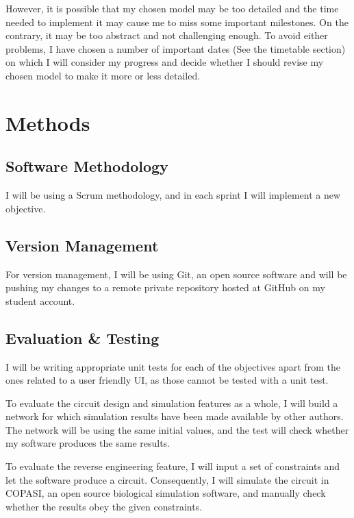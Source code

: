\documentclass{article}
\begin{document}
	\par However, it is possible that my chosen model may be too detailed and the time needed to implement it may cause me to miss some important milestones. On the contrary, it may be too abstract and not challenging enough. To avoid either problems, I have chosen a number of important dates (See the timetable section) on which I will consider my progress and decide whether I should revise my chosen model to make it more or less detailed.
	
	
	\section{Methods}
	
	\subsection{Software Methodology}
	\par I will be using a Scrum methodology, and in each sprint I will implement a new objective.
	
	
	\subsection{Version Management}
	\par For version management, I will be using Git, an open source software and will be pushing my changes to a remote private repository hosted at GitHub on my student account.
	
	\subsection{Evaluation \& Testing}
	\par I will be writing appropriate unit tests for each of the objectives apart from the ones related to a user friendly UI, as those cannot be tested with a unit test.
	\par To evaluate the circuit design and simulation features as a whole, I will build a network for which simulation results have been made available by other authors. The network will be using the same initial values, and the test will check whether my software produces the same results. 
	\par To evaluate the reverse engineering feature, I will input a set of constraints and let the software produce a circuit. Consequently, I will simulate the circuit in COPASI\cite{copasi}, an open source biological simulation software, and manually check whether the results obey the given constraints.
	
\end{document}
